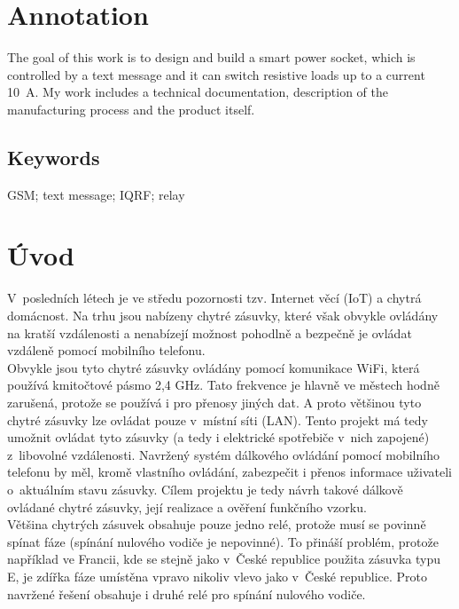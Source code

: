 \documentclass[12pt,a4paper,oneside]{article}
\begin{document}
\section*{Annotation}

The goal of this work is to design and build a smart power socket, which is controlled by a text message and it can switch resistive loads up to a current 10~A. My work includes a technical documentation, description of the manufacturing process and the product itself.

\subsection*{Keywords}

GSM; text message; IQRF; relay

\newpage

\tableofcontents

\newpage

\section*{Úvod}


V~posledních létech je ve středu pozornosti tzv. Internet věcí (IoT) a chytrá domácnost. Na trhu jsou nabízeny chytré zásuvky, které však obvykle ovládány na kratší vzdálenosti a nenabízejí možnost pohodlně a bezpečně je ovládat vzdáleně pomocí mobilního telefonu. \\

Obvykle jsou tyto chytré zásuvky ovládány pomocí komunikace WiFi, která používá kmitočtové pásmo 2,4 GHz. Tato frekvence je hlavně ve městech hodně zarušená, protože se používá i pro přenosy jiných dat\cite{wiki-ism-band}. A proto většinou tyto chytré zásuvky lze ovládat pouze v~místní síti (LAN). Tento projekt má tedy umožnit ovládat tyto zásuvky (a tedy i elektrické spotřebiče v~nich zapojené) z~libovolné vzdálenosti. Navržený systém dálkového ovládání pomocí mobilního telefonu by měl, kromě vlastního ovládání, zabezpečit i přenos informace uživateli o~aktuálním stavu zásuvky. Cílem projektu je tedy návrh takové dálkově ovládané chytré zásuvky, její realizace a ověření funkčního vzorku. \\

Většina chytrých zásuvek obsahuje pouze jedno relé\cite{teardown-wemo-switch}, protože musí se povinně spínat fáze (spínání nulového vodiče je nepovinné). To přináší problém, protože například ve Francii, kde se stejně jako v~České republice použita zásuvka typu E\cite{zasuvka-typ-e}, je zdířka fáze umístěna vpravo nikoliv vlevo jako v~České republice\cite{faze-vlevo-nebo-vpravo}. Proto navržené řešení obsahuje i druhé relé pro spínání nulového vodiče. \\
\end{document}

